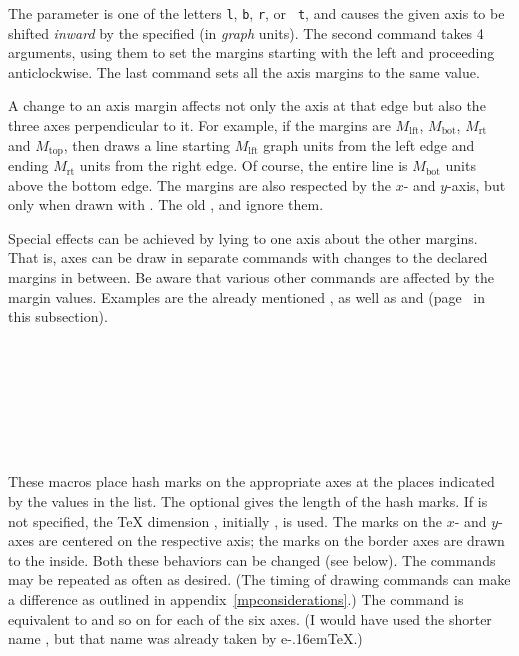\documentclass[letterpaper]{article}
\begin{document}
The parameter  is one of the letters \texttt{l},
\texttt{b}, \texttt{r}, or \texttt{ t}, and  causes the
given axis to be shifted \emph{inward} by the  specified (in
\emph{graph} units). The second command  takes
4 arguments, using them to set the margins starting with the left and
proceeding anticlockwise. The last command sets all the axis margins to
the same value.

A change to an axis margin affects not only the axis at that edge but
also the three axes perpendicular to it. For example, if the margins are
$M_{\mathrm{lft}}$, $M_{\mathrm{bot}}$, $M_{\mathrm{rt}}$ and
$M_{\mathrm{top}}$, then  draws a line starting
$M_{\mathrm{lft}}$ graph units from the left edge and ending
$M_{\mathrm{rt}}$ units from the right edge. Of course, the entire line
is $M_{\mathrm{bot}}$  units above the bottom edge. The margins are also
respected by the $x$- and $y$-axis, but only when drawn with .
The old ,  and  ignore them.

Special effects can be achieved by lying to one axis about the other
margins. That is, axes can be draw in separate commands with changes to
the declared margins in between. Be aware that various other commands
are affected by the margin values. Examples are the already mentioned
, as well as  and 
(page~\pageref{grid} in this subsection).

\begin{cd}
\\
\\
\\
\\
\\
\\
%
%
%
%
%
%
%
\end{cd}

These macros place hash marks on the appropriate axes at the places
indicated by the values in the list. The optional  gives the
length of the hash marks. If  is not specified, the \TeX{}
dimension , initially \dim{4pt}, is used. The marks on the
$x$- and $y$-axes are centered on the respective axis; the marks on the
border axes are drawn to the inside.  Both these behaviors can be
changed (see below). The commands may be repeated as often as desired.
(The timing of drawing commands can make a difference as outlined in
appendix~\ref{mpconsiderations}.) The command  is
equivalent to  and so on for each of the six axes. (I would
have used the shorter name , but that name was already taken
by e\kern-.16em\TeX{}.)
\end{document}
